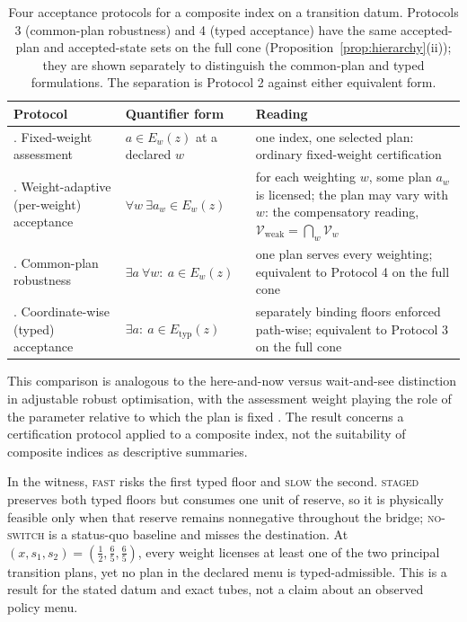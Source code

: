 \documentclass[preprint,11pt,authoryear]{elsarticle}
\theoremstyle{definition}
\theoremstyle{remark}
\newcommand{\Etyp}{E_{\mathrm{typ}}}
\newcommand{\Vweak}{\mathcal{V}_{\mathrm{weak}}}
\newcommand{\act}[1]{\textsc{#1}}
\begin{document}
\begin{table}[!htbp]
\centering\small
\caption{Four acceptance protocols for a composite index on a transition datum. Protocols 3 (common-plan robustness) and 4 (typed acceptance) have the same accepted-plan and accepted-state sets on the full cone (Proposition~\ref{prop:hierarchy}(ii)); they are shown separately to distinguish the common-plan and typed formulations. The separation is Protocol 2 against either equivalent form.}
\label{tab:protocols}
\begin{tabularx}{\textwidth}{>{\raggedright\arraybackslash}p{} >{\raggedright\arraybackslash}p{} X}
\toprule
Protocol & Quantifier form & Reading \\
\midrule
1. Fixed-weight assessment & $a\in E_w(z)$ at a declared $w$ & one index, one selected plan: ordinary fixed-weight certification \\
2. Weight-adaptive (per-weight) acceptance & $\forall w\ \exists a_w\in E_w(z)$ & for each weighting $w$, some plan $a_w$ is licensed; the plan may vary with $w$: the compensatory reading, $\Vweak=\bigcap_w\mathcal V_w$ \\
3. Common-plan robustness & $\exists a\ \forall w:\ a\in E_w(z)$ & one plan serves every weighting; equivalent to Protocol 4 on the full cone \\
4. Coordinate-wise (typed) acceptance & $\exists a:\ a\in\Etyp(z)$ & separately binding floors enforced path-wise; equivalent to Protocol 3 on the full cone \\
\bottomrule
\end{tabularx}
\end{table}

This comparison is analogous to the here-and-now versus wait-and-see distinction in adjustable robust optimisation, with the assessment weight playing the role of the parameter relative to which the plan is fixed \citep{BenTal2004}. The result concerns a certification protocol applied to a composite index, not the suitability of composite indices as descriptive summaries.

In the witness, \act{fast} risks the first typed floor and \act{slow} the second. \act{staged} preserves both typed floors but consumes one unit of reserve, so it is physically feasible only when that reserve remains nonnegative throughout the bridge; \act{no-switch} is a status-quo baseline and misses the destination. At $(x,s_1,s_2)=(\tfrac12,\tfrac65,\tfrac65)$, every weight licenses at least one of the two principal transition plans, yet no plan in the declared menu is typed-admissible. This is a result for the stated datum and exact tubes, not a claim about an observed policy menu.
\end{document}
